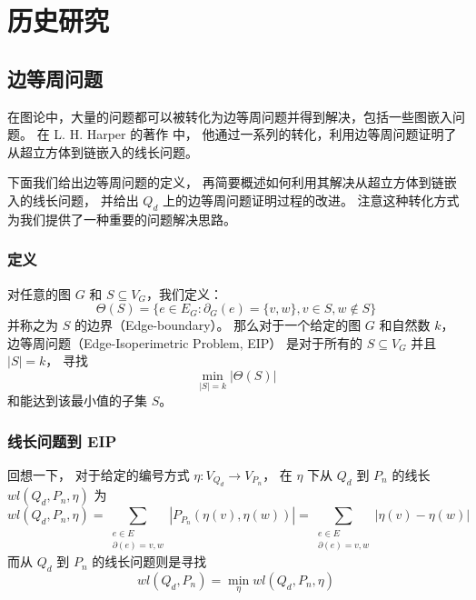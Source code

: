
\chapter{历史研究}
\label{Chapter 3}

\section{边等周问题}
\label{Section 3.1}

在图论中，大量的问题都可以被转化为边等周问题并得到解决，包括一些图嵌入问题。
在 L. H. Harper 的著作 \cite{Harper.1964,Harper.2004} 中，
他通过一系列的转化，利用边等周问题证明了从超立方体到链嵌入的线长问题。

下面我们给出边等周问题的定义，
再简要概述如何利用其解决从超立方体到链嵌入的线长问题，
并给出 $Q_d$ 上的边等周问题证明过程的改进。
注意这种转化方式为我们提供了一种重要的问题解决思路。

\subsection{定义}
\label{Subsection 3.1.1}

对任意的图 $G$ 和 $S \subseteq V_G$，我们定义：
\begin{equation*}
\Theta(S) = \{e \in E_G \colon \partial_G(e) = \{v, w\}, v \in S, w \notin S\}
\end{equation*}
并称之为 $S$ 的边界（Edge-boundary）。
那么对于一个给定的图 $G$ 和自然数 $k$，
边等周问题（Edge-Isoperimetric Problem, EIP）
是对于所有的 $S \subseteq V_G$ 并且 $|S| = k$，
寻找
\begin{equation*}
\min_{|S| = k} |\Theta(S)|
\end{equation*}
和能达到该最小值的子集 $S$。

\subsection{线长问题到 EIP}
\label{Subsection 3.1.2}

回想一下，
对于给定的编号方式 $\eta \colon V_{Q_d} \rightarrow V_{P_n}$，
在 $\eta$ 下从 $Q_d$ 到 $P_n$ 的线长 $wl(Q_d, P_n, \eta)$ 为
\begin{equation*}
wl(Q_d, P_n, \eta) = \sum_{\substack{
	e \in E \\
	\partial(e) = {v, w}
}} |P_{P_n}(\eta(v), \eta(w))| = \sum_{\substack{
	e \in E \\
	\partial(e) = {v, w}
}} |\eta(v) - \eta(w)|
\end{equation*}
而从 $Q_d$ 到 $P_n$ 的线长问题则是寻找
\begin{equation*}
wl(Q_d, P_n) = \min_\eta wl(Q_d, P_n, \eta)
\end{equation*}

